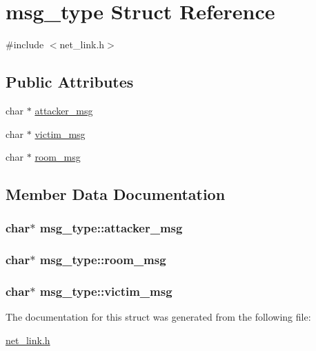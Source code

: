 \hypertarget{structmsg__type}{\section{msg\-\_\-type Struct Reference}
\label{structmsg__type}
}


{\ttfamily \#include $<$net\-\_\-link.\-h$>$}

\subsection*{Public Attributes}
\begin{DoxyCompactItemize}
\item 
char $\ast$ \hyperlink{structmsg__type_ae3e0e3f99fc89b890a07fbbe55faca50}{attacker\-\_\-msg}
\item 
char $\ast$ \hyperlink{structmsg__type_ae9a7bafabfd4e3db88146aa2c6113f1e}{victim\-\_\-msg}
\item 
char $\ast$ \hyperlink{structmsg__type_a766cdea233f2b1d252ca40bd2a459c7a}{room\-\_\-msg}
\end{DoxyCompactItemize}


\subsection{Member Data Documentation}
\hypertarget{structmsg__type_ae3e0e3f99fc89b890a07fbbe55faca50}{
\subsubsection[{attacker\-\_\-msg}]{\setlength{\rightskip}{0pt plus 5cm}char$\ast$ msg\-\_\-type\-::attacker\-\_\-msg}}\label{structmsg__type_ae3e0e3f99fc89b890a07fbbe55faca50}
\hypertarget{structmsg__type_a766cdea233f2b1d252ca40bd2a459c7a}{
\subsubsection[{room\-\_\-msg}]{\setlength{\rightskip}{0pt plus 5cm}char$\ast$ msg\-\_\-type\-::room\-\_\-msg}}\label{structmsg__type_a766cdea233f2b1d252ca40bd2a459c7a}
\hypertarget{structmsg__type_ae9a7bafabfd4e3db88146aa2c6113f1e}{
\subsubsection[{victim\-\_\-msg}]{\setlength{\rightskip}{0pt plus 5cm}char$\ast$ msg\-\_\-type\-::victim\-\_\-msg}}\label{structmsg__type_ae9a7bafabfd4e3db88146aa2c6113f1e}


The documentation for this struct was generated from the following file\-:\begin{DoxyCompactItemize}
\item 
\hyperlink{net__link_8h}{net\-\_\-link.\-h}\end{DoxyCompactItemize}
